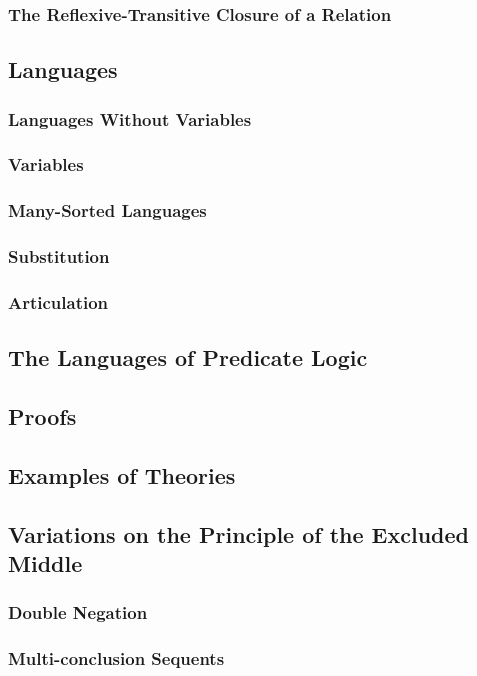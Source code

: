 \subsubsection{The Reflexive-Transitive Closure of a Relation}


\subsection{Languages}

\subsubsection{Languages Without Variables}
\subsubsection{Variables}
\subsubsection{Many-Sorted Languages}
\subsubsection{Substitution}
\subsubsection{Articulation}


\subsection{The Languages of Predicate Logic}


\subsection{Proofs}


\subsection{Examples of Theories}


\subsection{Variations on the Principle of the Excluded Middle}
\subsubsection{Double Negation}
\subsubsection{Multi-conclusion Sequents}

\appendix







